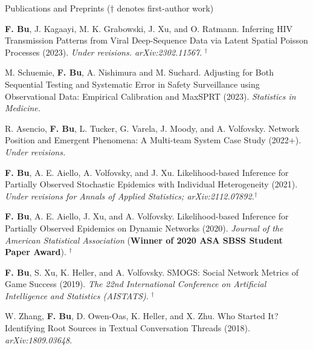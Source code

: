 \documentclass{resume} %
\begin{document}
\begin{rSection}{Publications and Preprints}
{\footnotesize{($\dagger$ denotes first-author work)}}


\textbf{F. Bu}, J. Kagaayi, M. K. Grabowski, J. Xu, and O. Ratmann.
Inferring HIV Transmission Patterns from Viral Deep-Sequence Data via Latent Spatial Poisson Processes (2023). \emph{Under revisions. arXiv:2302.11567}. $^\dagger$

\smallskip

M. Schuemie, \textbf{F. Bu}, A. Nishimura and M. Suchard.
Adjusting for Both Sequential Testing and Systematic Error in Safety Surveillance using Observational Data: Empirical Calibration and MaxSPRT (2023). \emph{Statistics in Medicine.}

\smallskip

R. Asencio, \textbf{F. Bu}, L. Tucker, G. Varela, J. Moody, and A. Volfovsky. 
Network Position and Emergent Phenomena: A Multi-team System Case Study (2022+). \emph{Under revisions.}

\smallskip

\textbf{F. Bu}, A. E. Aiello, A. Volfovsky, and J. Xu.  
Likelihood-based Inference for Partially Observed Stochastic Epidemics with Individual Heterogeneity (2021). \emph{Under revisions for Annals of Applied Statistics; arXiv:2112.07892.}$^\dagger$

\smallskip


\textbf{F. Bu}, A. E. Aiello, J. Xu, and A. Volfovsky. 
Likelihood-based Inference for Partially Observed Epidemics on Dynamic Networks (2020). \emph{Journal of the American Statistical Association} (\textbf{Winner of 2020 ASA SBSS Student Paper Award}). $^\dagger$

\smallskip

\textbf{F. Bu}, S. Xu, K. Heller, and A. Volfovsky. 
SMOGS: Social Network Metrics of Game Success (2019). \emph{The 22nd International Conference on Artificial Intelligence and Statistics (AISTATS)}. $^\dagger$

\smallskip

W. Zhang, \textbf{F. Bu}, D. Owen-Oas, K. Heller, and X. Zhu. 
Who Started It? Identifying Root Sources in Textual Conversation Threads (2018). \emph{arXiv:1809.03648}.

\end{rSection}

\end{document}
